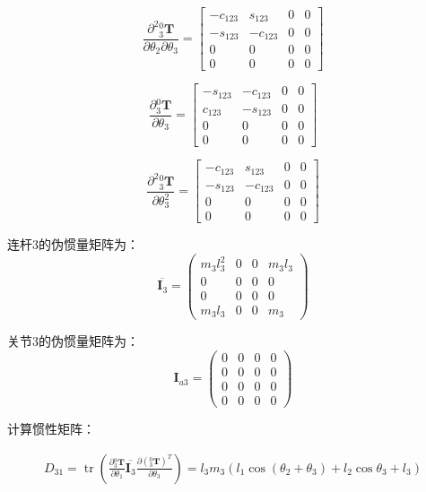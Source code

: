 \documentclass{homework}
\begin{document}
\begin{sol}
\[
  \frac{\partial^2 {_3^0}\mathbf{T}}{\partial \theta_2 \partial \theta_3} =
  \begin{bmatrix} 
    -c_{123} & s_{123} & 0 & 0 \\ 
    -s_{123} & -c_{123} & 0 & 0 \\ 
    0 & 0 & 0 & 0 \\ 
    0 & 0 & 0 & 0
  \end{bmatrix}
\]

\[
  \frac{\partial {_3^0}\mathbf{T}}{\partial \theta_3} =
  \begin{bmatrix} 
    -s_{123} & -c_{123} & 0 & 0 \\ 
    c_{123} & -s_{123} & 0 & 0 \\ 
    0 & 0 & 0 & 0 \\ 
    0 & 0 & 0 & 0
  \end{bmatrix}
\]

\[
  \frac{\partial^2 {_3^0}\mathbf{T}}{\partial \theta_3^2} =
  \begin{bmatrix} 
    -c_{123} & s_{123} & 0 & 0 \\ 
    -s_{123} & -c_{123} & 0 & 0 \\ 
    0 & 0 & 0 & 0 \\ 
    0 & 0 & 0 & 0
  \end{bmatrix}
\]

连杆3的伪惯量矩阵为：
\[
  \overline{\mathbf{I}_3} = 
  \begin{pmatrix}
    m_3 l_3^2 & 0 & 0 & m_3 l_3 \\
    0 & 0 & 0 & 0 \\
    0 & 0 & 0 & 0 \\
    m_3 l_3 & 0 & 0 & m_3
  \end{pmatrix}
\]

关节3的伪惯量矩阵为：
\[
  \mathbf{I}_{a3} = 
  \begin{pmatrix}
    0 & 0 & 0 & 0 \\
    0 & 0 & 0 & 0 \\
    0 & 0 & 0 & 0 \\
    0 & 0 & 0 & 0 
  \end{pmatrix}
\]

计算惯性矩阵：

\begin{align*}
  D_{31} = \operatorname{tr} (\frac{\partial {^0_3}\mathbf{T}}{\partial \theta_1} \overline{\mathbf{I}_3} \frac{\partial ({^0_3}\mathbf{T})^T}{\partial \theta_3}) 
         = l_3 m_3 (l_1 \cos(\theta_2 + \theta_3) + l_2 \cos\theta_3 + l_3)
\end{align*}


\end{sol}
\end{document}
